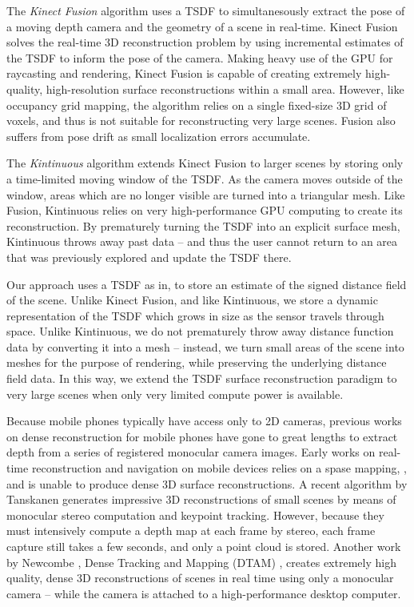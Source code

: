 \documentclass[10pt,twocolumn,letterpaper]{article}
\begin{document}
The \emph{Kinect Fusion} \cite{Newcombe} algorithm uses a TSDF to
simultanesously extract the pose of a moving depth camera and the geometry of a
scene in real-time. Kinect Fusion solves the real-time 3D reconstruction problem
by using incremental estimates of the TSDF to inform the pose of the camera.
Making heavy use of the GPU for raycasting and rendering, Kinect Fusion is
capable of creating extremely high-quality, high-resolution surface 
reconstructions within a small area. However, like occupancy grid mapping, the
algorithm relies on a single fixed-size 3D grid of voxels, and thus is not
suitable for reconstructing very large scenes. Fusion also suffers from pose
drift as small localization errors accumulate.

The \emph{Kintinuous} \cite{Whelan2013} algorithm extends Kinect Fusion to
larger scenes by storing only a time-limited moving window of the TSDF. As the camera
moves outside of the window, areas which are no longer visible are turned into a
triangular mesh. Like Fusion, Kintinuous relies on very high-performance GPU
computing to create its reconstruction.  By prematurely turning the TSDF into an
explicit surface mesh, Kintinuous throws away past data -- and thus the user
cannot return to an area that was previously explored and update the TSDF there.

Our approach uses a TSDF as in\cite{Curless1996,Newcombe,Whelan2013,Bylow2013},
to store an estimate of the signed distance field of the scene. Unlike Kinect
Fusion, and like Kintinuous, we store a dynamic representation of the TSDF
which grows in size as the sensor travels through space. Unlike Kintinuous, we
do not prematurely throw away distance function data by converting it into a
mesh -- instead, we turn small areas of the scene into meshes for the purpose
of rendering, while preserving the underlying distance field data. In this way,
we extend the TSDF surface reconstruction paradigm to very large scenes when only
very limited compute power is available.

Because mobile phones typically have access only to 2D cameras, previous works
on dense reconstruction for mobile phones have gone to great lengths to extract
depth from a series of registered monocular camera images.  Early works on
real-time reconstruction and navigation on mobile devices relies on a spase
mapping, \cite{KleinSparse}, and is unable to produce dense 3D surface
reconstructions.  A recent algorithm by Tanskanen \etal
\cite{TanskanenMetric} generates impressive 3D reconstructions of small scenes
by means of monocular stereo computation and keypoint tracking. However,
because they \cite{TanskanenMetric} must intensively compute a depth map at
each frame by stereo, each frame capture still takes a few seconds, and only a
point cloud is stored. Another work by Newcombe \etal, Dense Tracking and
Mapping (DTAM) \cite{DTAM},  creates extremely high quality, dense 3D
reconstructions of scenes in real time using only a monocular camera -- while
the camera is attached to a high-performance desktop computer.
\end{document}
